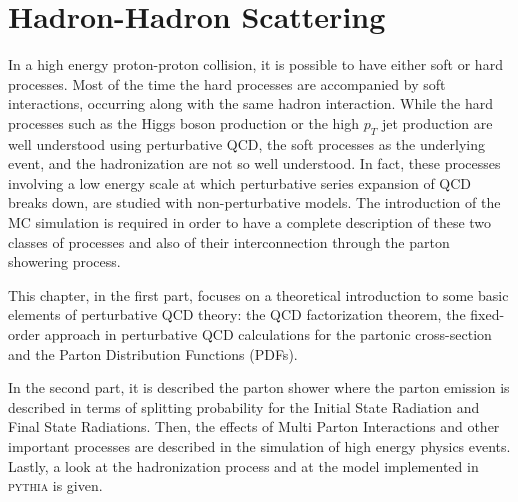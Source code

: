 %
%
%

%


\chapter{Hadron-Hadron Scattering}
\label{chap:Hadron-HadronScattering}





In a high energy proton-proton collision, it is possible to have either soft or hard processes.
Most of the time the hard processes are accompanied by soft interactions, occurring along with the same hadron interaction.
While the hard processes such as the Higgs boson production or the high $p_T$ jet production are well understood using perturbative QCD, the soft processes as the underlying event, and the hadronization are not so well understood. In fact, these processes involving a low energy scale at which perturbative series expansion of QCD breaks down, are studied with non-perturbative models. The introduction of the MC simulation is required in order to have a complete description of these two classes of processes and also of their interconnection through the parton showering process. 

This chapter, in the first part, focuses on a theoretical introduction to some basic elements of perturbative QCD theory: the QCD factorization theorem, the fixed-order approach in perturbative QCD calculations for the partonic cross-section and the Parton Distribution Functions (PDFs).  

\noindent In the second part, it is described the parton shower where the parton emission is described in terms of splitting probability for the Initial State Radiation and Final State Radiations. Then, the effects of Multi Parton Interactions and other important processes are described in the simulation of high energy physics events. Lastly, a look at the hadronization process and at the model implemented in \textsc{pythia} is given.

